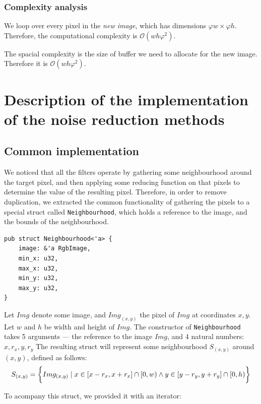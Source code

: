 \documentclass[12pt]{article}
\theoremstyle{definition}
\begin{document}
\subsubsection{Complexity analysis}

We loop over every pixel in the \emph{new image}, which has dimensions $\varphi w \times \varphi h$.
Therefore, the computational complexity is $\mathcal{O}(wh \varphi^2)$.

The spacial complexity is the size of buffer we need to allocate for the new image. Therefore it is $\mathcal{O}(wh \varphi^2)$.

\section{Description of the implementation of the noise reduction methods}

\subsection*{Common implementation}
We noticed that all the filters operate by gathering some neighbourhood around the target pixel,
and then applying some reducing function on that pixels to determine the value of the resulting pixel.
Therefore, in order to remove duplication, we extracted the common functionality 
of gathering the pixels to a special struct called \lstinline{Neighbourhood}, which holds a reference to the image, and the bounds of the neighbourhood.

\begin{lstlisting}
pub struct Neighbourhood<'a> {
    image: &'a RgbImage,
    min_x: u32,
    max_x: u32,
    min_y: u32,
    max_y: u32,
}
\end{lstlisting}

Let $Img$ denote some image, and $Img_{(x,y)}$ the pixel of $Img$ at coordinates $x,y$.
Let $w$ and $h$ be width and height of $Img$.
The constructor of \lstinline{Neighbourhood} takes 5 arguments --- the reference to the image $Img$, and 4 natural numbers: $x,r_x,y,r_y$
The resulting struct will represent some neighbourhood $S_{(x,y)}$ around $(x,y)$, defined as follows:
\begin{equation}
    S_{(x,y)} =
    \\\bigg\{
    Img_{(x,y)} \mid x \in [x-r_x,x+r_x] \cap [0,w) \land y \in [y-r_y, y+r_y] \cap [0,h)
    \bigg\}
\end{equation}

To acompany this struct, we provided it with an iterator:
\end{document}
